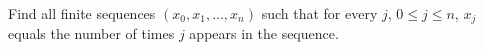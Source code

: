 Find all finite sequences $(x_0, x_1, \ldots, x_n)$ such that for every $j$, $0 \leq j \leq n$, $x_j$ equals the number of times $j$ appears in the sequence.
